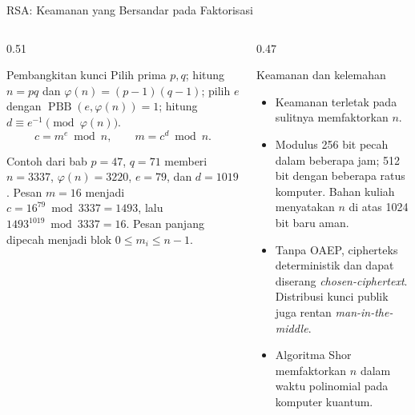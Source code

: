 \documentclass[aspectratio=169,11pt]{beamer}
\begin{document}
\begin{frame}{RSA: Keamanan yang Bersandar pada Faktorisasi}
    \scriptsize
    \begin{columns}[T,onlytextwidth]
        \begin{column}{0.51\textwidth}
            \begin{block}{Pembangkitan kunci}
                Pilih prima $p,q$; hitung $n=pq$ dan
                $\varphi(n)=(p-1)(q-1)$; pilih $e$ dengan
                $\operatorname{PBB}(e,\varphi(n))=1$; hitung
                $d \equiv e^{-1} \pmod{\varphi(n)}$.
                \[
                    c=m^{e} \bmod n, \qquad m=c^{d} \bmod n.
                \]
            \end{block}
            \begin{exampleblock}{Contoh dari bab}
                $p=47$, $q=71$ memberi $n=3337$, $\varphi(n)=3220$,
                $e=79$, dan $d=1019$. Pesan $m=16$ menjadi
                $c=16^{79}\bmod 3337=1493$, lalu
                $1493^{1019}\bmod 3337=16$. Pesan panjang dipecah menjadi blok
                $0 \le m_i \le n-1$.
            \end{exampleblock}
        \end{column}
        \begin{column}{0.47\textwidth}
            \begin{alertblock}{Keamanan dan kelemahan}
                \begin{itemize}
                    \setlength{\itemsep}{1pt}
                    \item Keamanan terletak pada sulitnya memfaktorkan $n$.
                    \item Modulus 256 bit pecah dalam beberapa jam; 512 bit
                          dengan beberapa ratus komputer. Bahan kuliah
                          menyatakan $n$ di atas 1024 bit baru aman.
                    \item Tanpa OAEP, cipherteks deterministik dan dapat
                          diserang \textit{chosen-ciphertext}. Distribusi kunci
                          publik juga rentan \textit{man-in-the-middle}.
                    \item Algoritma Shor memfaktorkan $n$ dalam waktu
                          polinomial pada komputer kuantum.
                \end{itemize}
            \end{alertblock}
        \end{column}
    \end{columns}
\end{frame}
\end{document}
